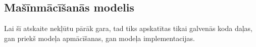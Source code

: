 \subsection{Mašīnmācīšanās modelis}

    Lai šī atskaite nekļūtu pārāk gara, tad tiks apskatītas tikai galvenās koda daļas, gan priekš
    modeļa apmācīšanas, gan modeļa implementacijas.

